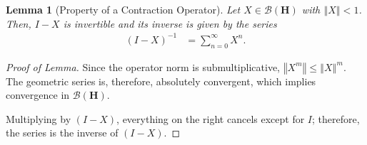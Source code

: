 \documentclass[10pt]{extarticle}
\newcommand{\norm}[1]{\left\Vert #1\right\Vert}
\theoremstyle{plain}
\newtheorem*{lemma}{Lemma}%
\theoremstyle{definition}
\theoremstyle{remark}
\renewcommand{\newline}{\hfill\break}
\begin{document}
  \begin{lemma}[Property of a Contraction Operator]
    Let $X\in \mathcal{B}\left(\mathbf{H}\right)$ with $\norm{X} < 1$. Then, $I-X$ is invertible and its inverse is given by the series
    \begin{align*}
      \left(I-X\right)^{-1} &= \sum_{n=0}^{\infty}X^n.
    \end{align*}
  \end{lemma}
  \begin{proof}[Proof of Lemma]
    Since the operator norm is submultiplicative, $\norm{X^m}\leq \norm{X}^{m}$. The geometric series is, therefore, absolutely convergent, which implies convergence in $\mathcal{B}\left(\mathbf{H}\right)$.\newline

    Multiplying by $(I-X)$, everything on the right cancels except for $I$; therefore, the series is the inverse of $(I-X)$.
  \end{proof}
\end{document}
